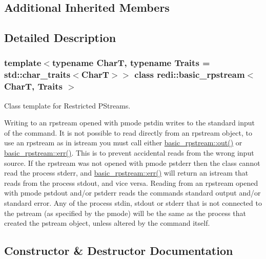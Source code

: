 \subsection*{Additional Inherited Members}


\subsection{Detailed Description}
\subsubsection*{template$<$typename CharT, typename Traits = std\+::char\+\_\+traits$<$\+Char\+T$>$$>$\newline
class redi\+::basic\+\_\+rpstream$<$ Char\+T, Traits $>$}

Class template for Restricted P\+Streams. 

Writing to an rpstream opened with {\ttfamily pmode} {\ttfamily pstdin} writes to the standard input of the command. It is not possible to read directly from an rpstream object, to use an rpstream as in istream you must call either \mbox{\hyperlink{classredi_1_1basic__rpstream_aa1de7000f183ef98a1be7b9c0e7a8590}{basic\+\_\+rpstream\+::out()}} or \mbox{\hyperlink{classredi_1_1basic__rpstream_a3170d8e6c74d8280d89918bb3334f324}{basic\+\_\+rpstream\+::err()}}. This is to prevent accidental reads from the wrong input source. If the rpstream was not opened with {\ttfamily pmode} {\ttfamily pstderr} then the class cannot read the process\textquotesingle{} {\ttfamily stderr}, and \mbox{\hyperlink{classredi_1_1basic__rpstream_a3170d8e6c74d8280d89918bb3334f324}{basic\+\_\+rpstream\+::err()}} will return an istream that reads from the process\textquotesingle{} {\ttfamily stdout}, and vice versa. Reading from an rpstream opened with {\ttfamily pmode} {\ttfamily pstdout} and/or {\ttfamily pstderr} reads the command\textquotesingle{}s standard output and/or standard error. Any of the process\textquotesingle{} {\ttfamily stdin}, {\ttfamily stdout} or {\ttfamily stderr} that is not connected to the pstream (as specified by the {\ttfamily pmode}) will be the same as the process that created the pstream object, unless altered by the command itself. 

\subsection{Constructor \& Destructor Documentation}
\mbox{\label{classredi_1_1basic__rpstream_a23084bc3f621c35484ea33dce79f9c3e}} 
